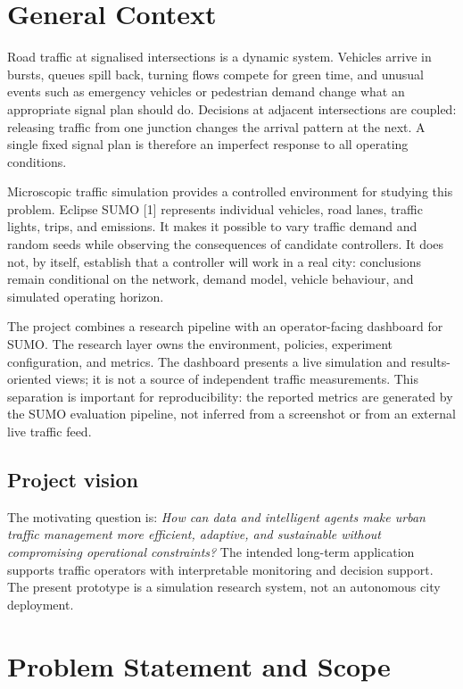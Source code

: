 \documentclass[11pt,a4paper]{article}
\begin{document}
\newpage
\tableofcontents
\newpage
{}

\section{General Context}
Road traffic at signalised intersections is a dynamic system. Vehicles arrive in
bursts, queues spill back, turning flows compete for green time, and unusual events
such as emergency vehicles or pedestrian demand change what an appropriate signal plan
should do. Decisions at adjacent intersections are coupled: releasing traffic from one
junction changes the arrival pattern at the next. A single fixed signal plan is
therefore an imperfect response to all operating conditions.

Microscopic traffic simulation provides a controlled environment for studying this
problem. Eclipse SUMO [1] represents individual vehicles, road lanes, traffic lights, trips,
and emissions. It makes it possible to vary traffic demand and random seeds while
observing the consequences of candidate controllers. It does not, by itself, establish
that a controller will work in a real city: conclusions remain conditional on the
network, demand model, vehicle behaviour, and simulated operating horizon.

The project combines a research pipeline with an operator-facing dashboard for SUMO.
The research layer owns the environment, policies, experiment configuration, and
metrics. The dashboard presents a live simulation and results-oriented views; it is
not a source of independent traffic measurements. This separation is important for
reproducibility: the reported metrics are generated by the SUMO evaluation pipeline,
not inferred from a screenshot or from an external live traffic feed.

\subsection{Project vision}
The motivating question is: \emph{How can data and intelligent agents make urban
traffic management more efficient, adaptive, and sustainable without compromising
operational constraints?} The intended long-term application supports traffic
operators with interpretable monitoring and decision support. The present prototype
is a simulation research system, not an autonomous city deployment.

\section{Problem Statement and Scope}
\end{document}
